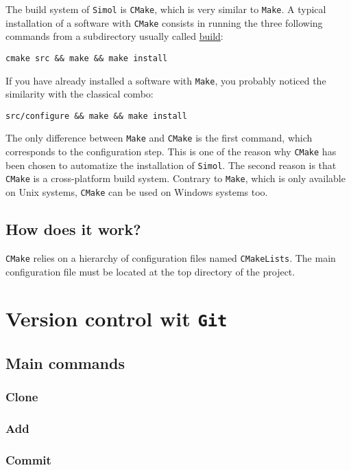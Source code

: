 \documentclass[12pt]{book}
\newcommand{\CMake}{\texttt{CMake}\xspace}
\newcommand{\CMakeLists}{\texttt{CMakeLists}\xspace}
\newcommand{\Git}{\texttt{Git}\xspace}
\newcommand{\Make}{\texttt{Make}\xspace}
\newcommand{\Simol}{\texttt{Simol}\xspace}
\begin{document}
The build system of \Simol is \CMake, which is very similar to \Make. A typical installation of a software with \CMake consists in running the three following commands from a subdirectory usually called \url{build}: 
\lstset{language=bash} 
\begin{lstlisting}
cmake src && make && make install
\end{lstlisting}
If you have already installed a software with \Make, you probably noticed the similarity with the classical combo:
\lstset{language=bash} 
\begin{lstlisting}
src/configure && make && make install
\end{lstlisting}
The only difference between \Make and \CMake is the first command, which corresponds to the configuration step. This is one of the reason why \CMake has been chosen to automatize the installation of \Simol. The second reason is that \CMake is a cross-platform build system. Contrary to \Make, which is only available on Unix systems, \CMake can be used on Windows systems too.

\subsection{How does it work?}

\CMake relies on a hierarchy of configuration files named \CMakeLists. The main configuration file must be located at the top directory of the project.


\section{Version control wit \Git}


\subsection{Main commands}


\subsubsection{Clone}

\subsubsection{Add}

\subsubsection{Commit}
\end{document}
